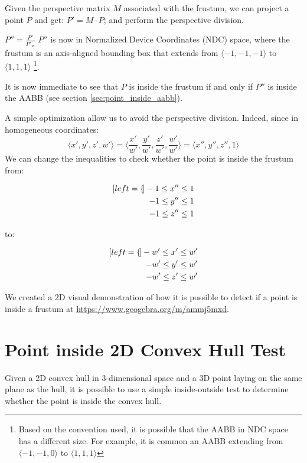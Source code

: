 \documentclass{PoliMi_MasterThesis}
\begin{document}
Given the perspective matrix $\textit{M}$ associated with the frustum, we can project a point $P$ and get: $P' = \textit{M} \cdot P$; and perform the perspective division. 

$P'' = \frac{P'}{P'_w}$ $P''$ is now in Normalized Device Coordinates (NDC) space, where the frustum is an axis-aligned bounding box that extends from $\langle -1, -1, -1 \rangle$ to $\langle 1, 1, 1 \rangle$ \footnote{Based on the convention used, it is possible that the AABB in NDC space has a different size. For example, it is common an AABB extending from $\langle -1, -1, 0 \rangle$ to $\langle 1, 1, 1 \rangle$}.

It is now immediate to see that $P$ is inside the frustum if and only if $P''$ is inside the AABB (see section \ref{sec:point_inside_aabb}).

A simple optimization allow us to avoid the perspective division. Indeed, since in homogeneous coordinates:
$$\langle x',y',z',w' \rangle = \langle \frac{x'}{w'},\frac{y'}{w'},\frac{z'}{w'},\frac{w'}{w'} \rangle = \langle x'',y'',z'',1 \rangle$$
We can change the inequalities to check whether the point is inside the frustum from:

\begin{minipage}{.4\linewidth}
	\begin{subequations}
		\begin{align*}[left=\empheqlbrace]
			-1 \leq x'' \leq 1 \\
			-1 \leq y'' \leq 1 \\
			-1 \leq z'' \leq 1
		\end{align*}
	\end{subequations}
\end{minipage}
		to:
\begin{minipage}{.4\linewidth}
	\begin{subequations}
		\begin{align*}[left=\empheqlbrace]
			-w' \leq x' \leq w' \\
			-w' \leq y' \leq w' \\
			-w' \leq z' \leq w'
		\end{align*}
	\end{subequations}
\end{minipage}

We created a 2D visual demonstration of how it is possible to detect if a point is inside a frustum at \url{https://www.geogebra.org/m/ammj5mxd}.

\section{Point inside 2D Convex Hull Test} \label{sec:point_inside_2dHull}
Given a 2D convex hull in 3-dimensional space and a 3D point laying on the same plane as the hull, it is possible to use a simple inside-outside test \cite{ray_triangle_intersection} to determine whether the point is inside the convex hull.
\end{document}
